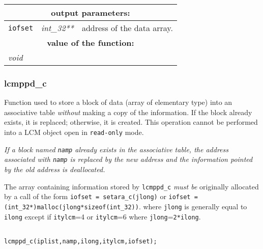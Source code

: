 \vskip 0.8cm

\noindent
\begin{tabular}{|p{1.5cm}|p{2cm}|p{11cm}|}
\hline
\multicolumn{3}{|c|}{\bf output parameters:} \\
\hline
{\tt iofset} & {\it int\_32**} & address of the data array. \\
\hline
\multicolumn{3}{|c|}{\bf value of the function:} \\
\hline
\multicolumn{2}{|l|}{\it void} &  \\
\hline
\end{tabular}

\subsubsection{lcmppd\_c}

Function used to store a block of data (array of elementary type) into an associative table
{\sl without} making a copy of the information. If the block already exists, it is replaced;
otherwise, it is created. This operation cannot be performed into a LCM object open in {\tt read-only} mode.

\vskip 0.2cm

{\sl If a block named {\tt namp} already exists in the associative table, the address associated
with {\tt namp} is replaced by the new address and the information pointed by the old address
is deallocated.}

\vskip 0.2cm

The array containing information stored by {\tt lcmppd\_c} {\sl must be} originally
allocated by a call of the form 
{\tt iofset = setara\_c(jlong)} or {\tt iofset = (int\_32*)malloc(jlong*sizeof(int\_32))}.
where {\tt jlong} is generally equal to {\tt ilong} except if
{\tt itylcm}=4 or {\tt itylcm}=6 where {\tt jlong}={\tt 2*ilong}.

\begin{verbatim}

lcmppd_c(iplist,namp,ilong,itylcm,iofset);
\end{verbatim}

